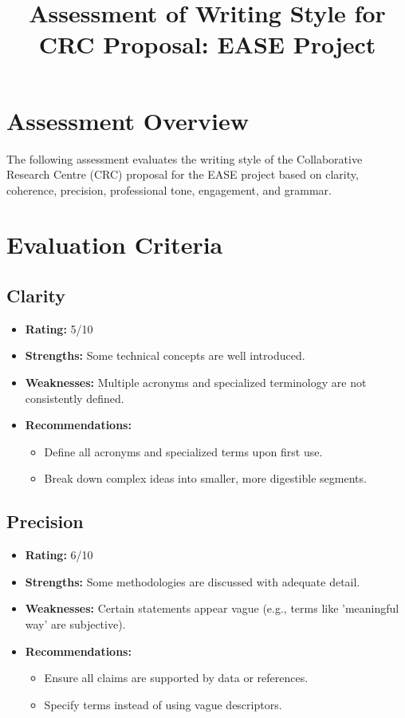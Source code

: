 \documentclass[11pt]{article}
\title{Assessment of Writing Style for CRC Proposal: EASE Project}
\author{}
\date{}
\begin{document}
\maketitle

\section{Assessment Overview}
The following assessment evaluates the writing style of the Collaborative Research Centre (CRC) proposal for the EASE project based on clarity, coherence, precision, professional tone, engagement, and grammar.

\section{Evaluation Criteria}

\subsection{Clarity}
\begin{itemize}
    \item \textbf{Rating:} 5/10
    \item \textbf{Strengths:} Some technical concepts are well introduced.
    \item \textbf{Weaknesses:} Multiple acronyms and specialized terminology are not consistently defined.
    \item \textbf{Recommendations:}
    \begin{itemize}
        \item Define all acronyms and specialized terms upon first use.
        \item Break down complex ideas into smaller, more digestible segments.
    \end{itemize}
\end{itemize}

\subsection{Precision}
\begin{itemize}
    \item \textbf{Rating:} 6/10
    \item \textbf{Strengths:} Some methodologies are discussed with adequate detail.
    \item \textbf{Weaknesses:} Certain statements appear vague (e.g., terms like 'meaningful way' are subjective).
    \item \textbf{Recommendations:}
    \begin{itemize}
        \item Ensure all claims are supported by data or references.
        \item Specify terms instead of using vague descriptors.
    \end{itemize}
\end{itemize}
\end{document}
